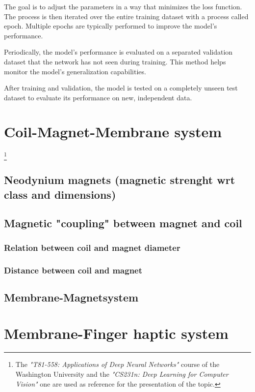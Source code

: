 The goal is to adjust the parameters in a way that minimizes the loss function. The process is then iterated over the entire training dataset with a process called epoch. Multiple epochs are typically performed to improve the model's performance.

Periodically, the model's performance is evaluated on a separated validation dataset that the network has not seen during training. This method helps monitor the model's generalization capabilities.

After training and validation, the model is tested on a completely unseen test dataset to evaluate its performance on new, independent data.



\section{Coil-Magnet-Membrane system}\footnote{The \textit{"T81-558: Applications of Deep Neural Networks"} course of the Washington University \cite{T81-558} and the \textit{"CS231n: Deep Learning for Computer Vision"}\cite{CS231n} one are used as reference for the presentation of the topic.}

\subsection{Neodynium magnets (magnetic strenght wrt class and dimensions)}

\subsection{Magnetic "coupling" between magnet and coil}

\subsubsection{Relation between coil and magnet diameter}

\subsubsection{Distance between coil and magnet}

\subsection{Membrane-Magnetsystem}

\section{Membrane-Finger haptic system }
